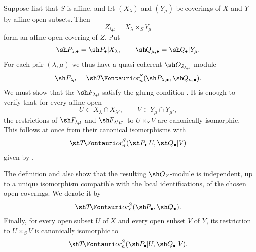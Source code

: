 \begin{env}[6.5.2]
\label{III.6.5.2}
Suppose first that $S$ is affine, and let $(X_\lambda)$ and
$(Y_\mu)$ be coverings of $X$ and $Y$ by affine open subsets.
Then
\[
  Z_{\lambda\mu}=X_\lambda\times_SY_\mu
\]
form an affine open covering of $Z$.  Put
\[
  \sh P_{\lambda,\bullet}=\sh P_\bullet|X_\lambda,
  \qquad
  \sh Q_{\mu,\bullet}=\sh Q_\bullet|Y_\mu.
\]
For each pair $(\lambda,\mu)$ we thus have a quasi-coherent
$\sh O_{Z_{\lambda\mu}}$-module
\[
  \sh F_{\lambda\mu}
  =
  \shTor_n^S(\sh P_{\lambda,\bullet},\sh Q_{\mu,\bullet}).
\]
We must show that the $\sh F_{\lambda\mu}$ satisfy the gluing
condition .  It is enough to verify that, for
every affine open
\[
  U\subset X_\lambda\cap X_{\lambda'},
  \qquad
  V\subset Y_\mu\cap Y_{\mu'},
\]
the restrictions of $\sh F_{\lambda\mu}$ and
$\sh F_{\lambda'\mu'}$ to $U\times_SV$ are canonically
isomorphic.  This follows at once from their canonical
isomorphisms with
\[
  \shTor_n^S(\sh P_\bullet|U,\sh Q_\bullet|V)
\]
given by .

The definition and  also show that the resulting
$\sh O_Z$-module is independent, up to a unique isomorphism
compatible with the local identifications, of the chosen open
coverings.  We denote it by
\[
  \shTor_n^S(\sh P_\bullet,\sh Q_\bullet).
\]
Finally, for every open subset $U$ of $X$ and every open subset
$V$ of $Y$, its restriction to $U\times_SV$ is canonically
isomorphic to
\[
  \shTor_n^S(\sh P_\bullet|U,\sh Q_\bullet|V).
\]
\end{env}


